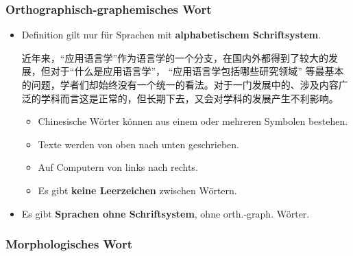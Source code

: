 \begin{frame}
\frametitle{Orthographisch-graphemisches Wort}

\begin{itemize}
	\item Definition gilt nur für Sprachen mit \textbf{alphabetischem Schriftsystem}.

	\ea 
近年来，``应用语言学''作为语言学的一个分支，在国内外都得到了较大的发展，但对于``什么是应用语言学''，
``应用语言学包括哪些研究领域'' 等最基本的问题，学者们却始终没有一个统一的看法。对于一门发展中的、涉及内容广泛的学科而言这是正常的，但长期下去，又会对学科的发展产生不利影响。
	\z 

\pause 

\begin{itemize}
	\item Chinesische Wörter können aus einem oder mehreren Symbolen bestehen.
	
	\item Texte werden von oben nach unten geschrieben.
	
	\item Auf Computern von links nach rechts.
	
	\item Es gibt \textbf{keine Leerzeichen} zwischen Wörtern.
\end{itemize}

\pause

	\item Es gibt \textbf{Sprachen ohne Schriftsystem}, \dash ohne orth.-graph. Wörter.
\end{itemize}

\end{frame}


\subsubsection{Morphologisches Wort}



